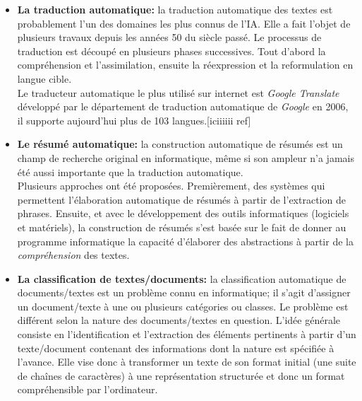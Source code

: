 \begin{itemize}
    \item \textbf{La traduction automatique:}
    la traduction automatique des textes est probablement l'un des domaines les plus connus de l'IA. Elle a fait l'objet de plusieurs travaux depuis les années 50 du siècle passé. Le processus de traduction est découpé en plusieurs phases successives. Tout d'abord la compréhension et l'assimilation, ensuite la réexpression et la reformulation en langue cible.\\
    Le traducteur automatique le plus utilisé sur internet est \emph{Google Translate} développé par le département de traduction automatique de \emph{Google} en 2006, il supporte aujourd'hui plus de 103 langues.[iciiiiii ref]

    \item \textbf{Le résumé automatique:}
    la construction automatique de résumés est un champ de recherche original en informatique, même si son ampleur n'a jamais été aussi importante que la traduction automatique.\\
    Plusieurs approches ont été proposées. Premièrement, des systèmes qui permettent l'élaboration automatique de résumés à partir de l'extraction de phrases. Ensuite, et avec le développement des outils informatiques (logiciels et matériels), la construction de résumés s'est basée sur le fait de donner au programme informatique la capacité d'élaborer des abstractions à partir de la \emph{compréhension} des textes.

    \item \textbf{La classification de textes/documents:}
    la classification automatique de documents/textes est un problème connu en informatique; il s'agit d'assigner un document/texte à une ou plusieurs catégories ou classes. Le problème est différent selon la nature des documents/textes en question. L'idée générale consiste en l'identification et l'extraction des éléments pertinents à partir d'un texte/document contenant des informations dont la nature est spécifiée à l'avance. Elle vise donc à transformer un texte de son format initial (une suite de chaînes de caractères) à une représentation structurée et donc un format compréhensible par l'ordinateur.\\
\end{itemize}

